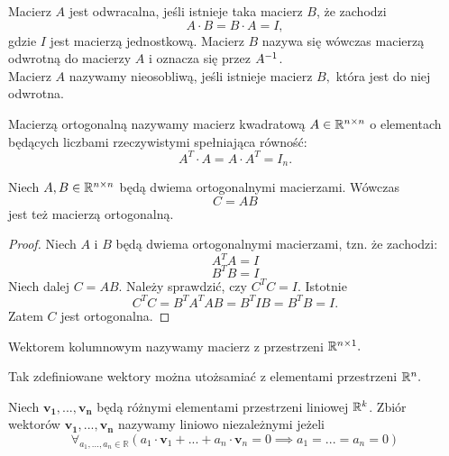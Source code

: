 \documentclass[12pt,a4paper]{report}
\newcommand{\vr}[1]{\mathbf{#1}}
\newcommand{\mx}[1]{{#1}}
\begin{document}
\begin{definition} 
Macierz $\mx{A}$ jest odwracalna, jeśli istnieje taka macierz $\mx{B}$, że zachodzi
$$
\mx{A}\cdot \mx{B}=\mx{B}\cdot \mx{A}=\mx{I},
$$ 
gdzie $\mx{I}$ jest macierzą jednostkową. Macierz $\mx{B}$ nazywa się wówczas macierzą odwrotną do macierzy $\mx{A}$ i oznacza się przez  $\inverse{\mx{A}}$. \\
Macierz $\mx{A}$ nazywamy nieosobliwą, jeśli istnieje macierz $\mx{B},$ która jest do niej odwrotna.

\end{definition}


\begin{definition}
Macierzą ortogonalną nazywamy macierz kwadratową $\mx{A}\in \setR^{n\times n}$ o elementach będących liczbami rzeczywistymi spełniająca równość:
$$
\mx{A}^{T}\cdot \mx{A}=\mx{A}\cdot \mx{A}^{T}=\mx{I}_{n}.
$$
\end{definition}

\begin{lemma}
Niech $\mx{A},\mx{B} \in \setR^{n \times n }$ będą dwiema ortogonalnymi macierzami. Wówczas 
$$
\mx{C}=\mx{A}\mx{B}
$$
jest też macierzą ortogonalną. 
\end{lemma}

\begin{proof}
Niech $\mx{A}$ i $\mx{B}$ będą dwiema ortogonalnymi macierzami, tzn. że zachodzi:
$$
\mx{A}^{T}\mx{A} = \mx{I}
$$
$$
\mx{B}^{T}\mx{B} = \mx{I}
$$
Niech dalej $\mx{C}=\mx{A}\mx{B}$. Należy sprawdzić, czy $\mx{C}^{T}\mx{C}=\mx{I}$. Istotnie
$$
\mx{C}^{T}\mx{C} = \mx{B}^{T}\mx{A}^{T}\mx{A}\mx{B} = \mx{B}^{T}\mx{I}\mx{B} = \mx{B}^{T}\mx{B} = \mx{I}.
$$
Zatem $\mx{C}$ jest ortogonalna.
\end{proof}

\begin{definition}
Wektorem kolumnowym nazywamy macierz z przestrzeni $\mathbb{R}^{n\times 1}.$
\end{definition}

Tak zdefiniowane wektory można utożsamiać z elementami przestrzeni $\mathbb{R}^{n}.$

\begin{definition}
Niech $\vr{v_{1}},..., \vr{v_{n}}$ będą różnymi elementami przestrzeni liniowej $\mathbb{R}^{k}$. Zbiór wektorów ${\vr{v_{1}},...,\vr{v_{n}}}$ nazywamy liniowo niezależnymi jeżeli 
$$
\forall_{a_{1},...,a_{n}\in \mathbb{R}} (a_{1}\cdot \vr{v}_{1} + ... + a_{n}\cdot \vr{v}_{n} = 0 \implies a_{1}=...=a_{n}=0)
$$ 
\end{definition}
\end{document}
